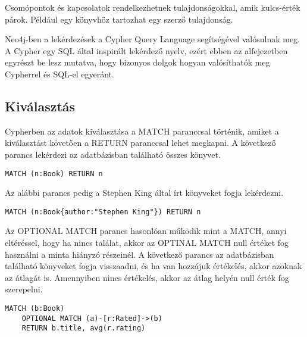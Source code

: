Csomópontok és kapcsolatok rendelkezhetnek tulajdonságokkal, amik kulcs-érték párok. Például egy könyvhöz tartozhat egy szerző tulajdonság.




Neo4j-ben a lekérdezések a Cypher Query Language segítségével valósulnak meg. A Cypher egy SQL által inspirált lekérdező nyelv, ezért ebben az alfejezetben egyrészt be lesz mutatva, hogy bizonyos dolgok hogyan valósíthatók meg Cypherrel és SQL-el egyeránt.\cite{cypher} \cite{sql}



\subsection{Kiválasztás}
Cypherben az adatok kiválasztása a MATCH paranccsal történik, amiket a kiválasztást követően a RETURN paranccsal lehet megkapni. A következő parancs lekérdezi az adatbázisban található összes könyvet.
\begin{lstlisting}[columns=fullflexible]
    MATCH (n:Book) RETURN n
\end{lstlisting}

\noindent Az alábbi parancs pedig a Stephen King által írt könyveket fogja lekérdezni.
\begin{lstlisting}[columns=fullflexible]
    MATCH (n:Book{author:"Stephen King"}) RETURN n
\end{lstlisting}

Az OPTIONAL MATCH parancs hasonlóan működik mint a MATCH, annyi eltéréssel, hogy ha nincs találat, akkor az OPTINAL MATCH null értéket fog használni a minta hiányzó részeinél. A következő parancs az adatbázisban található könyveket fogja visszaadni, és ha van hozzájuk értékelés, akkor azoknak az átlagát is. Amennyiben nincs értékelés, akkor az átlag helyén null érték fog szerepelni.

\begin{lstlisting}[columns=fullflexible]
    MATCH (b:Book) 
    OPTIONAL MATCH (a)-[r:Rated]->(b) 
    RETURN b.title, avg(r.rating)
\end{lstlisting}


